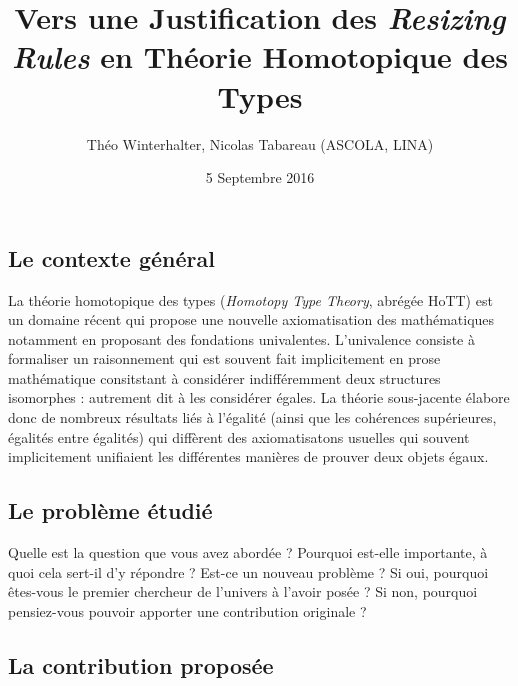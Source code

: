 \documentclass[11pt]{article}
\begin{document}
\title{Vers une Justification des \emph{Resizing Rules} en Théorie Homotopique
       des Types}

\author{Théo Winterhalter, Nicolas Tabareau (ASCOLA, LINA)}

\date{5 Septembre 2016}

\maketitle

\pagestyle{empty} %
\thispagestyle{empty}



\subsection*{Le contexte général}

\sloppy %
La théorie homotopique des types (\emph{Homotopy Type Theory}, abrégée HoTT)
est un domaine récent qui propose une nouvelle axiomatisation des mathématiques
notamment en proposant des fondations univalentes. L'univalence consiste à
formaliser un raisonnement qui est souvent fait implicitement en prose
mathématique consitstant à considérer indifféremment deux structures
isomorphes : autrement dit à les considérer égales.
La théorie sous-jacente élabore donc de nombreux résultats liés à l'égalité
(ainsi que les cohérences supérieures, égalités entre égalités) qui diffèrent
des axiomatisatons usuelles qui souvent implicitement unifiaient les différentes
manières de prouver deux objets égaux.

\subsection*{Le problème étudié}

Quelle est la question que vous avez abordée ?
Pourquoi est-elle importante, à quoi cela sert-il d'y répondre ?
Est-ce un nouveau problème ?
Si oui, pourquoi êtes-vous le premier chercheur de l'univers à l'avoir posée ?
Si non, pourquoi pensiez-vous pouvoir apporter une contribution originale ?

\subsection*{La contribution proposée}
\end{document}
